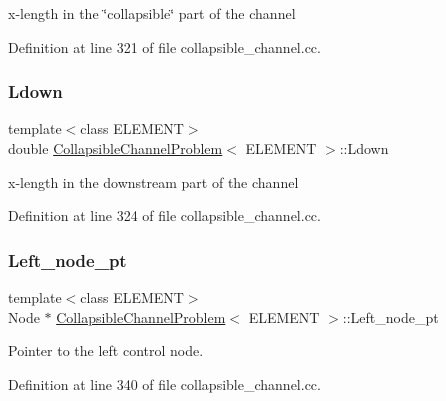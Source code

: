 x-\/length in the \char`\"{}collapsible\char`\"{} part of the channel 



Definition at line 321 of file collapsible\+\_\+channel.\+cc.

\mbox{\label{classCollapsibleChannelProblem_a5beb774a744bc7b7b1b821cb96bb445e}} 
\subsubsection{\texorpdfstring{Ldown}{Ldown}}
{\footnotesize\ttfamily template$<$class E\+L\+E\+M\+E\+NT$>$ \\
double \hyperlink{classCollapsibleChannelProblem}{Collapsible\+Channel\+Problem}$<$ E\+L\+E\+M\+E\+NT $>$\+::Ldown\hspace{0.3cm}{\ttfamily [private]}}



x-\/length in the downstream part of the channel 



Definition at line 324 of file collapsible\+\_\+channel.\+cc.

\mbox{\label{classCollapsibleChannelProblem_a479d0dce7e090898f696505927a56cf8}} 
\subsubsection{\texorpdfstring{Left\+\_\+node\+\_\+pt}{Left\_node\_pt}}
{\footnotesize\ttfamily template$<$class E\+L\+E\+M\+E\+NT$>$ \\
Node $\ast$ \hyperlink{classCollapsibleChannelProblem}{Collapsible\+Channel\+Problem}$<$ E\+L\+E\+M\+E\+NT $>$\+::Left\+\_\+node\+\_\+pt\hspace{0.3cm}{\ttfamily [private]}}



Pointer to the left control node. 



Definition at line 340 of file collapsible\+\_\+channel.\+cc.

